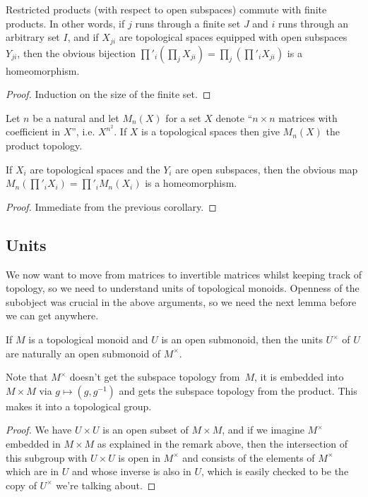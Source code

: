 \begin{corollary}
  \label{Homeomorph.restrictedProductPi}
  \leanok
  Restricted products (with respect to open subspaces) commute with finite products.
  In other words, if $j$ runs through a finite set $J$ and $i$ runs through an arbitrary
  set $I$, and if $X_{ji}$ are topological spaces equipped with open subspaces $Y_{ji}$,
  then the obvious bijection $\prod'_i(\prod_j X_{ji})=\prod_j\left(\prod'_i X_{ji}\right)$
  is a homeomorphism.
\end{corollary}
\begin{proof}
  Induction on the size of the finite set.
\end{proof}

 Let $n$ be a natural and let $M_n(X)$ for a set $X$ denote ``$n\times n$
  matrices with coefficient in $X$'', i.e. $X^{n^2}$. If $X$ is a topological
  spaces then give $M_n(X)$ the product topology.

\begin{corollary}
  \label{Homeomorph.restrictedProductMatrix}
  \leanok
  If $X_i$ are topological spaces and the $Y_i$ are open subspaces,
  then the obvious map $M_n(\prod'_iX_i)=\prod'_iM_n(X_i)$ is a homeomorphism.
\end{corollary}
\begin{proof}
  Immediate from the previous corollary.
\end{proof}

\subsection{Units}

We now want to move from matrices to invertible matrices whilst keeping track of topology,
so we need to understand units of topological monoids. Openness of the subobject was
crucial in the above arguments, so we need the next lemma before we can get anywhere.

\begin{lemma}
  \label{Submonoid.units_isOpen}
  \leanok
  If $M$ is a topological monoid and $U$ is an open submonoid, then
  the units $U^\times$ of $U$ are naturally an open submonoid of $M^\times$.
\end{lemma}
\begin{remark} Note that $M^\times$ doesn't get the subspace topology from~$M$,
  it is embedded into $M\times M$ via $g\mapsto (g,g^{-1})$ and gets the subspace
  topology from the product. This makes it into a topological group.
\end{remark}
\begin{proof}
  We have $U\times U$ is an open subset of $M\times M$, and if we imagine $M^\times$
  embedded in $M\times M$ as explained in the remark above, then the intersection
  of this subgroup with $U\times U$ is open in $M^\times$ and consists of the elements
  of $M^\times$ which are in $U$ and whose inverse is also in $U$, which is easily
  checked to be the copy of $U^\times$ we're talking about.
\end{proof}

